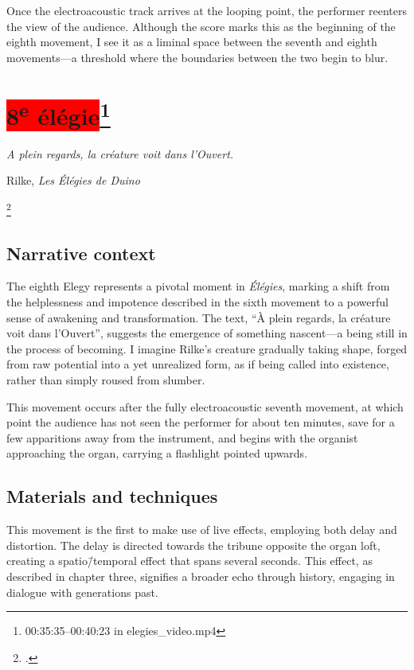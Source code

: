 \documentclass[12pt,twoside,maitrise]{dms_ks}
\theoremstyle{definition}
\begin{document}
{Once the electroacoustic track arrives at the looping point, the performer reenters the view of the audience. 
Although the score marks this as the beginning of the eighth movement, I see it as a liminal space between the seventh and eighth movements---a threshold where the boundaries between the two begin to blur.

\section{\colorbox{red}{8\textsuperscript{e} élégie}\footnote{00:35:35--00:40:23 in elegies\_video.mp4}}

\epigraph{\textit{A plein regards, la créature voit dans l’Ouvert.}}{Rilke, \textit{Les Élégies de Duino}\protect\footnotemark}

\footcitetext[75]{rilke_egies_1986}

\subsection{Narrative context}

The eighth Elegy represents a pivotal moment in \textit{Élégies}, marking a shift from the helplessness and impotence described in the sixth movement to a powerful sense of awakening and transformation. 
The text, “À plein regards, la créature voit dans l’Ouvert”, suggests the emergence of something nascent---a being still in the process of becoming. 
I imagine Rilke's creature gradually taking shape, forged from raw potential into a yet unrealized form, as if being called into existence, rather than simply roused from slumber.

This movement occurs after the fully electroacoustic seventh movement, at which point the audience has not seen the performer for about ten minutes, save for a few apparitions away from the instrument, and begins with the organist approaching the organ, carrying a flashlight pointed upwards. 

\subsection{Materials and techniques}

This movement is the first to make use of live effects, employing both delay and distortion. 
The delay is directed towards the tribune opposite the organ loft, creating a spatio\=/temporal effect that spans several seconds. 
This effect, as described in chapter three, signifies a broader echo through history, engaging in dialogue with generations past. 

}
\end{document}
